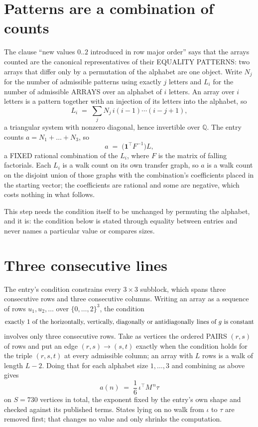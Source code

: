 \documentclass[11pt,a4paper]{article}
\theoremstyle{plain}
\theoremstyle{definition}
\begin{document}
\section{Patterns are a combination of counts}

The clause ``new values $0..2$ introduced in row major order'' says that the arrays
counted are the canonical representatives of their EQUALITY PATTERNS: two arrays that differ
only by a permutation of the alphabet are one object. Write $N_j$ for the number of admissible
patterns using exactly $j$ letters and $L_i$ for the number of admissible ARRAYS over an
alphabet of $i$ letters. An array over $i$ letters is a pattern together with an injection of
its letters into the alphabet, so
\[
L_i\;=\;\sum_{j}N_j\,i(i-1)\cdots(i-j+1),
\]
a triangular system with nonzero diagonal, hence invertible over $\mathbb{Q}$. The entry
counts $a=N_1+\dots+N_{3}$, so
\[
a\;=\;\bigl(\mathbf{1}^{\!\top}F^{-1}\bigr)L ,
\]
a FIXED rational combination of the $L_i$, where $F$ is the matrix of falling factorials.
Each $L_i$ is a walk count on its own transfer graph, so $a$ is a walk count on the disjoint
union of those graphs with the combination's coefficients placed in the starting vector; the
coefficients are rational and some are negative, which costs nothing in what follows.

This step needs the condition itself to be unchanged by permuting the alphabet, and it is:
the condition below is stated through equality between entries and never names a particular
value or compares sizes.

\section{Three consecutive lines}

The entry's condition constrains every $3\times3$ subblock, which spans three consecutive
rows and three consecutive columns. Writing an array as a sequence of rows
$u_1,u_2,\dots$ over $\{0,\dots,2\}^{3}$, the condition
\[
\text{exactly }1\text{ of the horizontally, vertically, diagonally or antidiagonally lines of }g\text{ \text{is constant}}
\]
involves only three consecutive rows. Take as vertices the ordered PAIRS $(r,s)$ of
rows and put an edge $(r,s)\to(s,t)$ exactly when the condition holds for the triple
$(r,s,t)$ at every admissible column; an array with $L$ rows is a walk of length $L-2$.
Doing that for each alphabet size $1,\dots,3$ and combining as above gives
\[
a(n)\;=\;\frac{1}{6}\,\iota^{\!\top}M^{\,n}\tau
\]
on $S=730$ vertices in total, the exponent fixed by the entry's own shape and checked against
its published terms. States lying on no walk from $\iota$ to $\tau$ are removed first; that
changes no value and only shrinks the computation.
\end{document}

